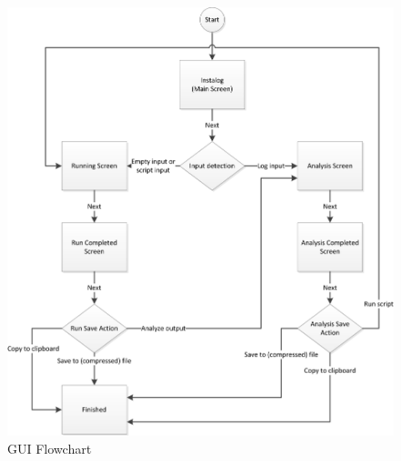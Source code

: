 \begin{figure}[h!]
  	\centering
	\includegraphics{figures/gui/GUI_Flowchart.png}
  	\caption{GUI Flowchart}
  	\label{fig:gui_flowchart}
\end{figure}
